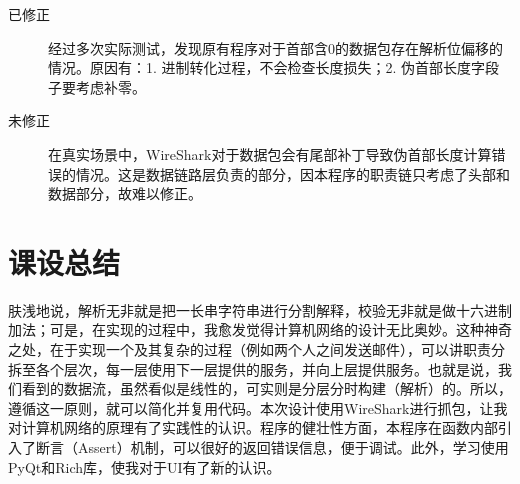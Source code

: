 \documentclass[a4paper,11pt]{article}
\begin{document}
\begin{spacing}{1.2}
\begin{CJK}{UTF8}{gbsn}
\begin{description}
	\item [已修正] 经过多次实际测试，发现原有程序对于首部含0的数据包存在解析位偏移的情况。原因有：1. 进制转化过程，不会检查长度损失；2. 伪首部长度字段子要考虑补零。
	\item [未修正] 在真实场景中，WireShark对于数据包会有尾部补丁导致伪首部长度计算错误的情况。这是数据链路层负责的部分，因本程序的职责链只考虑了头部和数据部分，故难以修正。
\end{description}



\newpage
\section{课设总结}

肤浅地说，解析无非就是把一长串字符串进行分割解释，校验无非就是做十六进制加法；可是，在实现的过程中，我愈发觉得计算机网络的设计无比奥妙。这种神奇之处，在于实现一个及其复杂的过程（例如两个人之间发送邮件），可以讲职责分拆至各个层次，每一层使用下一层提供的服务，并向上层提供服务。也就是说，我们看到的数据流，虽然看似是线性的，可实则是分层分时构建（解析）的。所以，遵循这一原则，就可以简化并复用代码。本次设计使用WireShark进行抓包，让我对计算机网络的原理有了实践性的认识。程序的健壮性方面，本程序在函数内部引入了断言（Assert）机制，可以很好的返回错误信息，便于调试。此外，学习使用PyQt和Rich库，使我对于UI有了新的认识。

\end{CJK}
\end{spacing}
\end{document}
